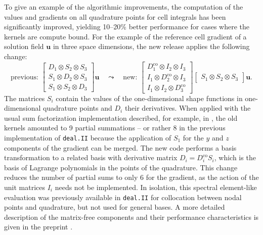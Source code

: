 \documentclass{ansarticle-preprint}
\newcommand{\specialword}[1]{\texttt{#1}}
\newcommand{\dealii}{{\specialword{deal.II}}\xspace}
\begin{document}
To give an example of the algorithmic improvements, the computation of the
values and gradients on all quadrature points for cell integrals has been
significantly improved, yielding 10--20\% better performance for cases where
the kernels are compute bound. For the example of the reference cell gradient
of a solution field $\mathbf u$ in three space dimensions, the new release
applies the following change:
\begin{equation*}
  \text{previous: }
  \begin{bmatrix}
    D_{1} \otimes S_{2} \otimes S_{3}\\
    S_{1} \otimes D_{2} \otimes S_{3}\\
    S_{1} \otimes S_{2} \otimes D_{3}
  \end{bmatrix}
  \mathbf u
  \quad
  \leadsto
  \quad
  \text{new: }
  \begin{bmatrix}
    D_{1}^{\mathrm{co}} \otimes I_{2} \otimes I_{3}\\
    I_{1} \otimes D_{2}^{\mathrm{co}} \otimes I_{3}\\
    I_{1} \otimes I_{2} \otimes D_{3}^{\mathrm{co}}
  \end{bmatrix}
  \begin{bmatrix}
    S_{1} \otimes S_{2} \otimes S_{3}
  \end{bmatrix}
  \mathbf u.
\end{equation*}
The matrices $S_i$ contain the values of the one-dimensional shape functions
in one-dimensional quadrature points and $D_i$ their derivatives. When applied
with the usual sum factorization implementation described, for
example, in
\cite{KronbichlerKormann2012}, the old kernels amounted to 9 partial
summations -- or rather 8 in the previous implementation of \dealii{} because
the application of $S_1$ for the $y$ and $z$ components of the gradient can be
merged. The new code performs a basis transformation to a related basis with
derivative matrix $D_i = D_i^{\mathrm{co}} S_i$, which is the basis of
Lagrange polynomials in the points of the quadrature. This change reduces the
number of partial sums to only 6 for the gradient, as the action of the unit
matrices $I_i$ needs not be implemented. In isolation, this spectral
element-like evaluation was previously available in \dealii{} for collocation
between nodal points and quadrature, but not used for general bases. A more
detailed description of the matrix-free components and their performance
characteristics is given in the preprint \cite{KronbichlerKormann2017}.


\end{document}
